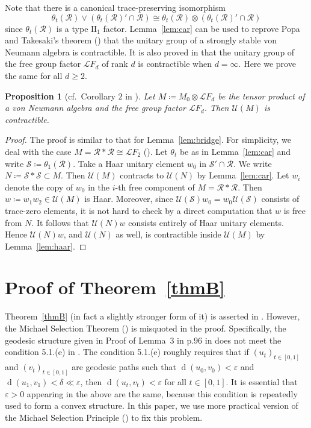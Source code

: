 \documentclass[12pt,nosumlimits,nonamelimits]{amsart}
\newtheorem{prop}[thm]{Proposition}
\theoremstyle{remark}
\newcommand{\cL}{\mathcal{L}}
\newcommand{\cR}{\mathcal{R}}
\newcommand{\cS}{\mathcal{S}}
\newcommand{\cU}{\mathcal{U}}
\newcommand{\ve}{\varepsilon}
\newcommand{\id}{\mathrm{id}}
\DeclareMathOperator{\dist}{d}
\begin{document}
Note that there is a canonical trace-preserving isomorphism 
\[
\theta_t(\cR)\vee (\theta_t(\cR)'\cap\cR)
 \cong \theta_t(\cR)\otimes(\theta_t(\cR)'\cap\cR)
\]
since $\theta_t(\cR)$ is a type $\mathrm{II}_1$ factor. 
Lemma~\ref{lem:car} can be used to reprove 
Popa and Takesaki's theorem (\cite{pt}) that 
the unitary group of a strongly stable von Neumann 
algebra is contractible. 
It is also proved in \cite{pt} that the unitary group of 
the free group factor $\cL F_d$ of rank $d$ 
is contractible when $d=\infty$. 
Here we prove the same for all $d\geq2$. 
\begin{prop}[cf.\ Corollary $2$ in \cite{pt}]
Let $M\coloneqq M_0\otimes \cL F_d$ be the tensor product of 
a von Neumann algebra 
and the free group factor $\cL F_d$.  
Then $\cU(M)$ is contractible. 
\end{prop}
\begin{proof}
The proof is similar to that for Lemma~\ref{lem:bridge}.
For simplicity, we deal with the case 
$M=\cR*\cR\cong \cL F_2$ (\cite{dykema}). 
Let $\theta_t$ be as in Lemma~\ref{lem:car} and 
write $\cS\coloneqq\theta_1(\cR)$.
Take a Haar unitary element $w_0$ in $\cS'\cap\cR$.
We write $N\coloneqq\cS*\cS\subset M$. 
Then $\cU(M)$ contracts to $\cU(N)$ by Lemma~\ref{lem:car}.
Let $w_i$ denote the copy of $w_0$ 
in the $i$-th free component of $M=\cR*\cR$. 
Then $w\coloneqq w_1w_2\in\cU(M)$ is Haar. 
Moreover, since $\cU(\cS)w_0 = w_0\cU(\cS)$ 
consists of trace-zero elements, it is not hard to check 
by a direct computation that $w$ is free from $N$. 
It follows that $\cU(N)w$ consists entirely 
of Haar unitary elements. 
Hence $\cU(N)w$, and $\cU(N)$ as well, 
is contractible inside $\cU(M)$ by Lemma~\ref{lem:haar}. 
\end{proof}
%
%
%
\section{Proof of Theorem~\ref{thmB}}\label{sec:thmc}
%
Theorem~\ref{thmB} (in fact a slightly stronger form of it) 
is asserted in \cite{pt}. 
However, the Michael Selection Theorem (\cite{michael2}) 
is misquoted in the proof. 
Specifically, the geodesic structure given in 
Proof of Lemma~3 in p.96 in \cite{pt} does not meet 
the condition 5.1.(e) in \cite{michael2}. 
The condition 5.1.(e) roughly requires that 
if $(u_t)_{t\in[0,1]}$ and $(v_t)_{t\in[0,1]}$ are geodesic paths 
such that $\dist(u_0,v_0)<\ve$ and $\dist(u_1,v_1)<\delta\ll\ve$, 
then $\dist(u_t,v_t)<\ve$ for all $t\in[0,1]$. 
It is essential that $\ve>0$ appearing in the above 
are the same, because this condition is repeatedly used 
to form a convex structure. 
In this paper, we use more practical version of 
the Michael Selection Principle (\cite{michael1}) to 
fix this problem.
\end{document}
